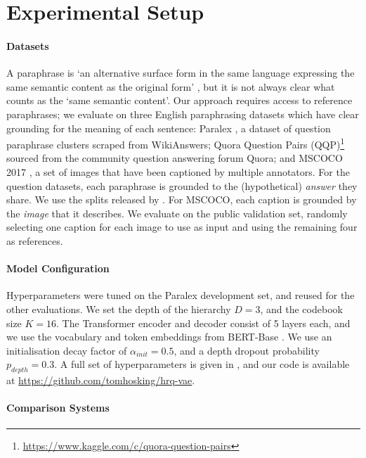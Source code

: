 \documentclass[11pt]{article}
\begin{document}
\section{Experimental Setup}


\paragraph{Datasets}

A paraphrase is `an alternative surface form in the
same language expressing the same semantic content as the original
form' \cite{madnanidorr}, but it is not always clear what counts as the `same semantic content'. Our approach requires access to reference paraphrases; we evaluate on three English paraphrasing datasets which have clear grounding for the meaning of each sentence: Paralex
\cite{fader-etal-2013-paraphrase}, a dataset of question paraphrase
clusters scraped from WikiAnswers; Quora Question Pairs
(QQP)\footnote{\mbox{\url{https://www.kaggle.com/c/quora-question-pairs}}}
sourced from the community question answering forum Quora; and MSCOCO 2017 \cite{mscoco}, a set of images that have been captioned by multiple annotators. For the question datasets, each paraphrase is grounded to the (hypothetical) \textit{answer} they share. We use the splits released by \citet{hosking-lapata-2021-factorising}. For MSCOCO, each caption is grounded by the \textit{image} that it describes. We evaluate on the public validation set, randomly selecting one caption for each image to use as input and using the remaining four as references.

\paragraph{Model Configuration}

Hyperparameters were tuned on the Paralex development set, and reused for the other evaluations. We set the depth of the hierarchy $D = 3$, and the codebook size $K = 16$. The Transformer encoder and decoder consist of 5 layers each, and we use the vocabulary and token embeddings from BERT-Base \cite{devlin_bert:_2018}. We use an initialisation decay factor of $\alpha_{init} = 0.5$, and a depth dropout probability $p_{depth} = 0.3$. A full set of hyperparameters is given in , and our code is available at {\url{ https://github.com/tomhosking/hrq-vae}}.



\paragraph{Comparison Systems}
\end{document}
